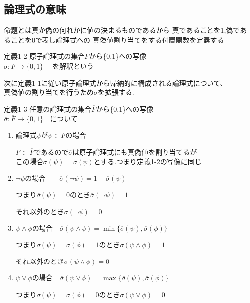 \documentclass[10pt]{jarticle}
\begin{document}
	\subsection{論理式の意味}
	命題とは真か偽の何れかに値の決まるものであるから
	真であることを1,偽であることを0で表し論理式への 
	真偽値割り当てをする付置関数を定義する
	\begin{itembox}[l]{定義1-2}
		原子論理式の集合\(F\)から\{0,1\}への写像 \\
		\(\sigma : F \rightarrow \{0,1\}\) 　を解釈という
	\end{itembox}
	次に定義1-1に従い原子論理式から帰納的に構成される論理式について、\\
	真偽値の割り当てを行うため\(\sigma\)を拡張する. 
	\begin{itembox}[l]{定義1-3}
		任意の論理式の集合\(\overline{F}\)から\{0,1\}への写像 \\
		\(\overline{\sigma} : \overline{F} \rightarrow \{0,1\}\)　について
		\begin{enumerate}
			\item 論理式\(\psi\)が\(\psi \in F\)の場合

			\(F \subset \overline{F}\)であるので\(\overline{\sigma}\)は原子論理式にも真偽値を割り当てるが \\ 
			この場合\(\overline{\sigma}(\psi) = \sigma(\psi)\)とする.つまり定義1-2の写像に同じ

			\item \(\lnot\psi\)の場合　　\(\overline{\sigma}(\lnot\psi) = 1 - \overline{\sigma}(\psi)\)

			つまり\(\overline{\sigma}(\psi) = 0\)のとき\(\overline{\sigma}(\lnot\psi) = 1\)
			
			それ以外のとき\(\overline{\sigma}(\lnot\psi) = 0\)


			\item \(\psi \land \phi \)の場合　\(\overline{\sigma}(\psi \land \phi) = \min\{\overline{\sigma}(\psi), \overline{\sigma}(\phi)\} \)
			
			つまり\(\overline{\sigma}(\psi) = \overline{\sigma}(\phi) = 1\)のとき\(\overline{\sigma}(\psi \land \phi) = 1\)
			
			それ以外のとき\(\overline{\sigma}(\psi \land \phi) = 0\)
			
			\item \(\psi \lor \phi\)の場合　\(\overline{\sigma}(\psi \lor \phi) = \max\{\overline{\sigma}(\psi), \overline{\sigma}(\phi)\} \)
			
			つまり\(\overline{\sigma}(\psi) = \overline{\sigma}(\phi) = 0\)のとき\(\overline{\sigma}(\psi \lor \phi) = 0\)
			

\end{enumerate}
\end{itembox}
\end{document}
